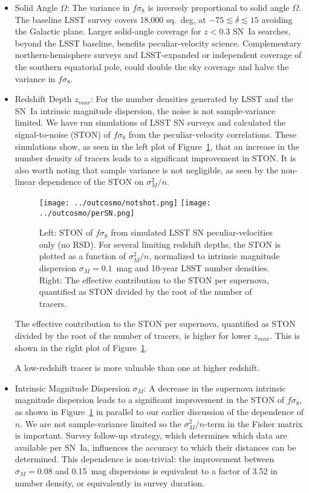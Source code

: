 \documentclass{aastex62}   	%
\begin{document}
\begin{itemize}
\item Solid Angle $\Omega$:
The variance in $f\sigma_8$ is inversely proportional to solid angle $\Omega$.  The baseline
LSST survey covers 18,000 sq.~deg, at $-75 \lesssim \delta \lesssim15$ avoiding the Galactic plane.  Larger solid-angle coverage for $z<0.3$ SN~Ia searches, beyond
the LSST baseline, benefits peculiar-velocity science.  Complementary northern-hemisphere surveys and LSST-expanded or independent
coverage of the southern equatorial pole, could double
the sky coverage and halve the variance in $f\sigma_8$.
\item Redshift Depth $z_{max}$:
For the number densities generated by LSST and the SN~Ia intrinsic magnitude dispersion, the noise is not sample-variance
limited.  We have run simulations of LSST SN surveys
and calculated the signal-to-noise (STON) of $f\sigma_8$ from the peculiar-velocity correlations. These simulations show, as seen in the left plot
of  Figure~\ref{notshot:fig}, that an increase in the number density of tracers leads to a significant improvement in STON.
It is also worth noting that sample variance is not negligible, as seen by the non-linear dependence of the  STON on $\sigma_M^2/n$. 

\begin{figure}
\centering
\texttt{[image: ../outcosmo/notshot.png]}
\texttt{[image: ../outcosmo/perSN.png]}
\caption{Left: STON of $f\sigma_8$ from simulated LSST SN peculiar-velocities only (no RSD).  For several limiting redshift depths, the STON is plotted as a
function of $\sigma_M^2/n$, normalized to intrinsic magnitude dispersion $\sigma_M=0.1$~mag and 10-year LSST number densities.
Right: The effective contribution to the STON per supernova, quantified as STON divided by the root of the number of tracers.
\label{notshot:fig}}
\end{figure}

The effective contribution to the STON per supernova, quantified as STON divided by the root of the number of tracers, is higher for lower
$z_{max}$.  This is shown in the
right plot of   Figure~\ref{notshot:fig}.

A low-redshift tracer is more valuable than one at higher redshift.

\item Intrinsic Magnitude Dispersion $\sigma_M$:
A decrease in the supernova intrinsic magnitude dispersion leads to a significant improvement in  the STON of $f\sigma_8$,
as shown in Figure~\ref{notshot:fig} in parallel to our earlier discussion of the dependence of $n$.  We are not sample-variance
limited so the $\sigma^2_M/n$-term
in the Fisher matrix is important.
Survey follow-up strategy,
which determines which data are available per SN~Ia, influences the accuracy to which their distances can be determined. 
This dependence is non-trivial: the improvement between $\sigma_M=0.08$ and 0.15~mag dispersions is equivalent to a factor of 3.52
 in number density, or equivalently in survey duration. 
 

\end{itemize}
\end{document}
